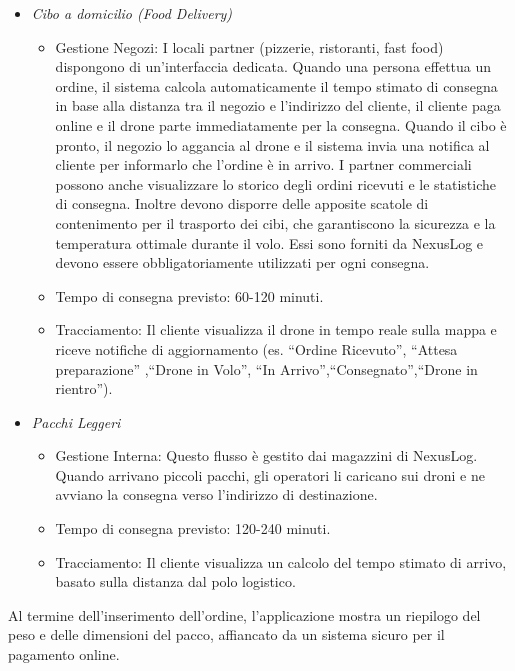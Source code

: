 \documentclass[11pt, a4paper]{article}
\begin{document}
\begin{itemize}
    \item \textit{Cibo a domicilio (Food Delivery)}
    \begin{itemize}
        \item Gestione Negozi: I locali partner (pizzerie, ristoranti, fast food) dispongono di un'interfaccia dedicata. Quando una persona effettua un ordine, il sistema calcola automaticamente il tempo stimato di consegna in base alla distanza tra il negozio e l'indirizzo del cliente, il cliente paga online e il drone parte immediatamente per la consegna. Quando il cibo è pronto, il negozio lo aggancia al drone e il sistema invia una notifica al cliente per informarlo che l'ordine è in arrivo. I partner commerciali possono anche visualizzare lo storico degli ordini ricevuti e le statistiche di consegna. Inoltre devono disporre delle apposite scatole di contenimento per il trasporto dei cibi, che garantiscono la sicurezza e la temperatura ottimale durante il volo. Essi sono forniti da NexusLog e devono essere obbligatoriamente utilizzati per ogni consegna.
        \item Tempo di consegna previsto: 60-120 minuti.
        \item Tracciamento: Il cliente visualizza il drone in tempo reale sulla mappa e riceve notifiche di aggiornamento (es. ``Ordine Ricevuto'', ``Attesa preparazione'' ,``Drone in Volo'', ``In Arrivo'',``Consegnato'',``Drone in rientro'').
    \end{itemize}
    
    \item \textit{Pacchi Leggeri}
    \begin{itemize}
        \item Gestione Interna: Questo flusso è gestito dai magazzini di NexusLog. Quando arrivano piccoli pacchi, gli operatori li caricano sui droni e ne avviano la consegna verso l'indirizzo di destinazione.
        \item Tempo di consegna previsto: 120-240 minuti.
        \item Tracciamento: Il cliente visualizza un calcolo del tempo stimato di arrivo, basato sulla distanza dal polo logistico.
    \end{itemize}
\end{itemize}

Al termine dell'inserimento dell'ordine, l'applicazione mostra un riepilogo del peso e delle dimensioni del pacco, affiancato da un sistema sicuro per il pagamento online. 
\end{document}
